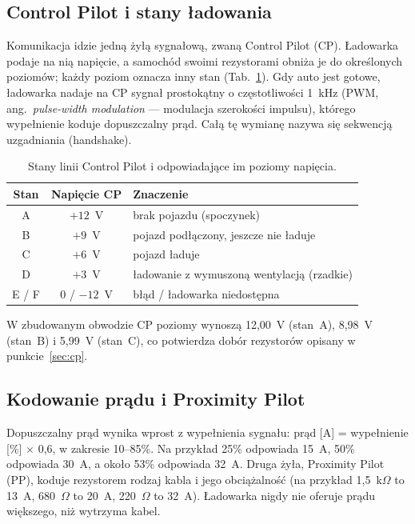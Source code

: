 \documentclass[11pt]{article}
\newcommand{\key}[1]{#1}
\begin{document}
\subsection{Control Pilot i stany ładowania}

Komunikacja idzie jedną żyłą sygnałową, zwaną Control Pilot (CP). Ładowarka podaje na nią napięcie, a samochód swoimi rezystorami obniża je do określonych poziomów; każdy poziom oznacza inny stan (Tab.~\ref{tab:stany}). Gdy auto jest gotowe, ładowarka nadaje na CP sygnał prostokątny o częstotliwości 1~kHz (PWM, ang.\ \textit{pulse-width modulation} --- modulacja szerokości impulsu), którego wypełnienie koduje dopuszczalny prąd. Całą tę wymianę nazywa się sekwencją uzgadniania (handshake).

\begin{table}[h]
\centering
\begin{tabularx}{0.9\linewidth}{@{}c c X@{}}
\toprule
\textbf{Stan} & \textbf{Napięcie CP} & \textbf{Znaczenie} \\
\midrule
A & $+12$~V & brak pojazdu (spoczynek) \\
B & $+9$~V & pojazd podłączony, jeszcze nie ładuje \\
C & $+6$~V & pojazd ładuje \\
D & $+3$~V & ładowanie z wymuszoną wentylacją (rzadkie) \\
E / F & $0$ / $-12$~V & błąd / ładowarka niedostępna \\
\bottomrule
\end{tabularx}
\caption{Stany linii Control Pilot i odpowiadające im poziomy napięcia.}
\label{tab:stany}
\end{table}

W zbudowanym obwodzie CP poziomy wynoszą 12,00~V (stan~A), 8,98~V (stan~B) i 5,99~V (stan~C), co potwierdza dobór rezystorów opisany w punkcie~\ref{sec:cp}.

\subsection{Kodowanie prądu i Proximity Pilot}

Dopuszczalny prąd wynika wprost z wypełnienia sygnału: \key{prąd [A] = wypełnienie [\%] $\times$ 0,6}, w zakresie 10--85\%. Na przykład 25\% odpowiada 15~A, 50\% odpowiada 30~A, a około 53\% odpowiada 32~A. Druga żyła, Proximity Pilot (PP), koduje rezystorem rodzaj kabla i jego obciążalność (na przykład 1,5~k$\Omega$ to 13~A, 680~$\Omega$ to 20~A, 220~$\Omega$ to 32~A). Ładowarka nigdy nie oferuje prądu większego, niż wytrzyma kabel.
\end{document}
